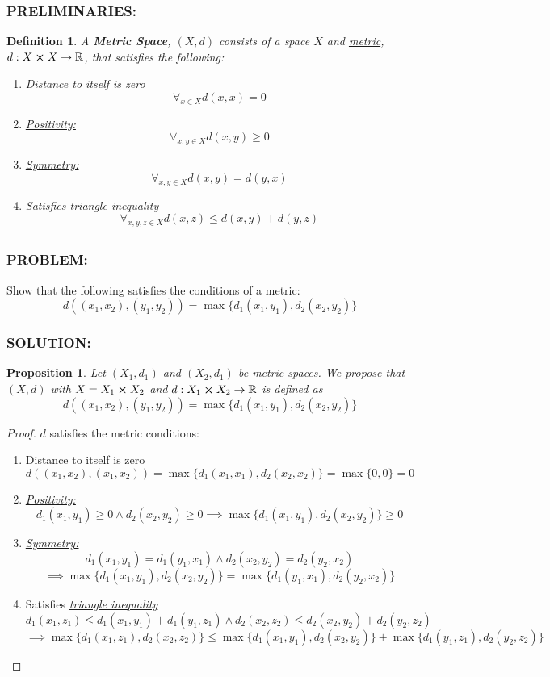 \documentclass[]{article}
\newcommand{\Problem}{\subsubsection*{\textbf{PROBLEM:}}}
\newcommand{\Solution}{\subsubsection*{\textbf{SOLUTION:}}}
\newcommand{\Preliminaries}{\subsubsection*{\textbf{PRELIMINARIES:}}}
\newcommand{\R}{\mathbb{R}}
\newtheorem{definition}{Definition}
\newtheorem{proposition}{Proposition}
\begin{document}
\Preliminaries
\begin{definition}
    A \emph{\textbf{Metric Space}}, $(X,d)$ consists of a space $X$ and \emph{\underline{metric}}, $d : X \cross X \to \R$, that satisfies the following:
    \begin{enumerate}
        \item Distance to itself is zero \[
            \forall_{x \in X} d(x,x) = 0
        \] \item \emph{\underline{Positivity:}} \[
            \forall_{x,y \in X} d(x,y) \geq 0
        \] \item \emph{\underline{Symmetry:}} \[
            \forall_{x,y \in X} d(x,y) = d(y,x)
        \] \item Satisfies \emph{\underline{triangle inequality}} \[
            \forall_{x,y,z \in X} d(x,z) \leq d(x,y) + d(y,z)
        \]
    \end{enumerate}
\end{definition}

\subsection{}
\Problem
Show that the following satisfies the conditions of a metric: \[
    d((x_1, x_2), (y_1, y_2)) = \max\{d_1(x_1,y_1), d_2(x_2,y_2)\}
\]

\Solution
\begin{proposition}
    Let $(X_1,d_1)$ and $(X_2,d_1)$ be metric spaces.
    We propose that $(X, d)$ with $X = X_1 \cross X_2$ and $d :  X_1 \cross X_2 \to \R$ is defined as \[
        d((x_1, x_2), (y_1, y_2)) = \max\{d_1(x_1,y_1), d_2(x_2,y_2)\}
    \]
\end{proposition}
\begin{proof}
    $d$ satisfies the metric conditions:
    \begin{enumerate}
        \item Distance to itself is zero \[
            d((x_1, x_2), (x_1, x_2)) = \max\{d_1(x_1,x_1), d_2(x_2,x_2)\} = \max\{0, 0\} = 0
        \] \item \emph{\underline{Positivity:}} \[
            d_1(x_1,y_1) \geq 0 \land d_2(x_2, y_2) \geq 0 \implies \max\{d_1(x_1,y_1), d_2(x_2,y_2)\} \geq 0
        \]
         \item \emph{\underline{Symmetry:}} \[
            d_1(x_1,y_1) = d_1(y_1,x_1) \land d_2(x_2, y_2) = d_2(y_2,x_2)
        \]\[
            \implies \max\{d_1(x_1,y_1), d_2(x_2,y_2)\} = \max\{d_1(y_1,x_1), d_2(y_2,x_2)\}
        \] \item Satisfies \emph{\underline{triangle inequality}} \[
            d_1(x_1,z_1) \leq d_1(x_1,y_1) + d_1(y_1,z_1) \land d_2(x_2,z_2) \leq d_2(x_2,y_2) + d_2(y_2,z_2) 
        \]\[    
            \implies \max\{d_1(x_1,z_1), d_2(x_2,z_2)\} \leq \max\{d_1(x_1,y_1), d_2(x_2,y_2)\} + \max\{d_1(y_1,z_1), d_2(y_2,z_2)\}
        \]
    \end{enumerate}
\end{proof}
\end{document}
